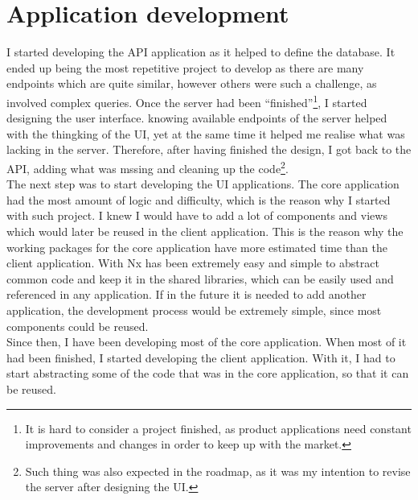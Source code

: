 \documentclass[a4paper, 12pt, oneside]{book}
\begin{document}
\section{Application development}
I started developing the API application as it helped to define the database. It ended up being the most repetitive project to develop as there are many endpoints which are quite similar, however others were such a challenge, as involved complex queries. Once the server had been ``finished''\footnote{It is hard to consider a project finished, as product applications need constant improvements and changes in order to keep up with the market.}, I started designing the user interface. knowing available endpoints of the server helped with the thingking of the UI, yet at the same time it helped me realise what was lacking in the server. Therefore, after having finished the design, I got back to the API, adding what was mssing and cleaning up the code\footnote{Such thing was also expected in the roadmap, as it was my intention to revise the server after designing the UI.}.
\\[8pt]
The next step was to start developing the UI applications. The core application had the most amount of logic and difficulty, which is the reason why I started with such project. I knew I would have to add a lot of components and views which would later be reused in the client application. This is the reason why the working packages for the core application have more estimated time than the client application. With Nx has been extremely easy and simple to abstract common code and keep it in the shared libraries, which can be easily used and referenced in any application. If in the future it is needed to add another application, the development process would be extremely simple, since most components could be reused.
\\[8pt]
Since then, I have been developing most of the core application. When most of it had been finished, I started developing the client application. With it, I had to start abstracting some of the code that was in the core application, so that it can be reused.
\end{document}
